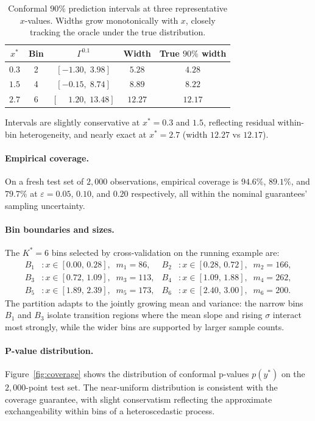 \documentclass[11pt]{article}
\begin{document}
\begin{table}[h]
\centering
\begin{tabular}{ccccc}
\hline
$x^*$ & Bin & $\Gamma^{0.1}$ & Width & True $90\%$ width \\
\hline
$0.3$ & 2 & $[-1.30,\; 3.98]$ & $5.28$ & $4.28$ \\
$1.5$ & 4 & $[-0.15,\; 8.74]$ & $8.89$ & $8.22$ \\
$2.7$ & 6 & $[\phantom{-}1.20,\; 13.48]$ & $12.27$ & $12.17$ \\
\hline
\end{tabular}
\caption{Conformal $90\%$ prediction intervals at three representative $x$-values.
Widths grow monotonically with $x$, closely tracking the oracle under the true distribution.}
\label{tab:ci}
\end{table}

Intervals are slightly conservative at $x^* = 0.3$ and $1.5$, reflecting residual
within-bin heterogeneity, and nearly exact at $x^* = 2.7$ (width $12.27$ vs $12.17$).

\paragraph{Empirical coverage.}
On a fresh test set of $2{,}000$ observations, empirical coverage is $94.6\%$,
$89.1\%$, and $79.7\%$ at $\varepsilon = 0.05$, $0.10$, and $0.20$ respectively,
all within the nominal guarantees' sampling uncertainty.

\paragraph{Bin boundaries and sizes.}
The $K^* = 6$ bins selected by cross-validation on the running example are:
\begin{align*}
  B_1 &: x \in [0.00,\,0.28],\;\; m_1 = 86, &
  B_2 &: x \in [0.28,\,0.72],\;\; m_2 = 166, \\
  B_3 &: x \in [0.72,\,1.09],\;\; m_3 = 113, &
  B_4 &: x \in [1.09,\,1.88],\;\; m_4 = 262, \\
  B_5 &: x \in [1.89,\,2.39],\;\; m_5 = 173, &
  B_6 &: x \in [2.40,\,3.00],\;\; m_6 = 200.
\end{align*}
The partition adapts to the jointly growing mean and variance:
the narrow bins $B_1$ and $B_3$ isolate transition regions where the mean slope
and rising $\sigma$ interact most strongly, while the wider bins are supported by
larger sample counts.

\paragraph{P-value distribution.}
Figure~\ref{fig:coverage} shows the distribution of conformal p-values $p(y^*)$ on the
$2{,}000$-point test set.
The near-uniform distribution is consistent with the coverage guarantee, with
slight conservatism reflecting the approximate exchangeability within bins of a
heteroscedastic process.
\end{document}
